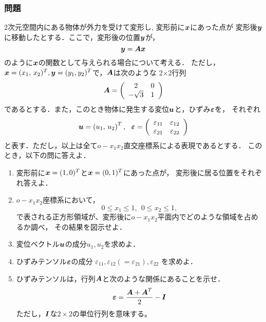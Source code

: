 \documentclass[10pt,a4j]{jarticle}
\begin{document}
\subsubsection*{問題}
2次元空間内にある物体が外力を受けて変形し, 変形前に$\mbox{\boldmath $x$}$にあった点が
変形後$\mbox{\boldmath $y$}$に移動したとする．ここで，変形後の位置$\mbox{\boldmath $y$}$が，
\begin{equation}
	\mbox{\boldmath $y$}=\mbox{\boldmath $A$}\mbox{\boldmath $x$}
	\label{eqn:disp_fld}
\end{equation}
のように$\mbox{\boldmath $x$}$の関数として与えられる場合について考える．
ただし，$\mbox{\boldmath $x$}=(x_1,\, x_2)^T, \mbox{\boldmath $y$}=(y_1, y_2)^T$で，$\mbox{\boldmath $A$}$は次のような
2$\times$2行列
\begin{equation}
	\mbox{\boldmath $A$}=
	\left(
	\begin{array}{cc}
		 2 & 0 \\
	 -\sqrt{3} & 1 
	\end{array}
	\label{eqn:Amat}
	\right)
\end{equation}
であるとする．また，このとき物体に発生する変位$\mbox{\boldmath $u$}$と，ひずみ$\mbox{\boldmath $\varepsilon$}$を，
それぞれ
\begin{equation}
	\fat{u}=\left( u_1,\, u_2 \right)^T
	, \ \ 
	\fat{\varepsilon}
	=
	\left(
	\begin{array}{cc}
		\varepsilon_{11} & \varepsilon_{12} \\
		\varepsilon_{21} & \varepsilon_{22} 
	\end{array}
	\right)
\end{equation}
と表す．ただし，以上は全て$o-x_1x_2$直交座標系による表現であるとする．
このとき，以下の問に答えよ．
\begin{enumerate}
\item
	変形前に$\mbox{\boldmath $x$}=(1,0)^T$と$\mbox{\boldmath $x$}=(0,1)^T$にあった点が，
	変形後に居る位置をそれぞれ答えよ．
\item
	$o-x_1x_2$座標系において，
	\[
		0\leq x_1 \leq 1, 
		\ \
		0\leq x_2 \leq 1, 
	\]
	で表される正方形領域が、変形後に$o-x_1x_2$平面内でどのような領域を占めるか調べ，
	その結果を図示せよ．
\item
	変位ベクトル$\mbox{\boldmath $u$}$の成分$u_1,u_2$を求めよ．
\item
	ひずみテンソル$\mbox{\boldmath $\varepsilon$}$の成分
	$\varepsilon_{11},\varepsilon_{12}(=\varepsilon_{21}), \varepsilon_{22}$
	を求めよ．
\item
	ひずみテンソルは，行列$\mbox{\boldmath $A$}$と次のような関係にあることを示せ．
	\[
		\mbox{\boldmath $\varepsilon$}=\frac{\mbox{\boldmath $A$}+\mbox{\boldmath $A$}^T}{2}-\mbox{\boldmath $I$}
	\]
	ただし，$\mbox{\boldmath $I$}$な$2\times 2$の単位行列を意味する。
\end{enumerate}
\end{document}
